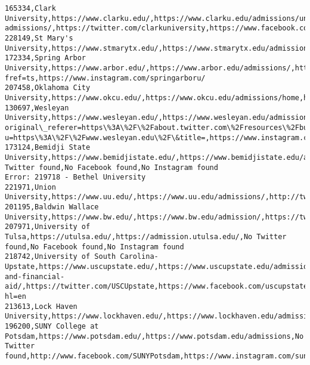 \documentclass[11pt]{article}
\begin{document}
\begin{Verbatim}[commandchars=\\\{\}]
165334,Clark University,https://www.clarku.edu/,https://www.clarku.edu/admissions/undergraduate-admissions/,https://twitter.com/clarkuniversity,https://www.facebook.com/ClarkUniversityWorcester,https://www.instagram.com/clarkuniversity/
228149,St Mary's University,https://www.stmarytx.edu/,https://www.stmarytx.edu/admission/,https://www.twitter.com/StMarysU,https://www.facebook.com/31373936394/posts/10155957464411395,https://www.instagram.com/p/BpaWVHIn48D/
172334,Spring Arbor University,https://www.arbor.edu/,https://www.arbor.edu/admissions/,https://twitter.com/springarboru,https://www.facebook.com/springarboru/?fref=ts,https://www.instagram.com/springarboru/
207458,Oklahoma City University,https://www.okcu.edu/,https://www.okcu.edu/admissions/home,https://twitter.com/okcu,https://www.facebook.com/oklahomacityuniversity,https://www.instagram.com/oklahomacityuniversity/
130697,Wesleyan University,https://www.wesleyan.edu/,https://www.wesleyan.edu/admission/,https://twitter.com/intent/tweet?original\_referer=https\%3A\%2F\%2Fabout.twitter.com\%2Fresources\%2Fbuttons\&text=\&tw\_p=tweetbutton\&url=https\%3A\%2F\%2Fwww.wesleyan.edu\%2F,https://www.facebook.com/sharer/sharer.php?u=https\%3A\%2F\%2Fwww.wesleyan.edu\%2F\&title=,https://www.instagram.com/wesleyan\_u/
173124,Bemidji State University,https://www.bemidjistate.edu/,https://www.bemidjistate.edu/admissions/,No Twitter found,No Facebook found,No Instagram found
Error: 219718 - Bethel University
221971,Union University,https://www.uu.edu/,https://www.uu.edu/admissions/,http://twitter.com/UnionUniversity/,http://facebook.com/UnionUniversity/,http://instagram.com/UnionUniversity/
201195,Baldwin Wallace University,https://www.bw.edu/,https://www.bw.edu/admission/,https://twitter.com/BaldwinWallace,http://www.facebook.com/baldwinwallaceuniversity,https://www.instagram.com/explore/tags/YJ4L/
207971,University of Tulsa,https://utulsa.edu/,https://admission.utulsa.edu/,No Twitter found,No Facebook found,No Instagram found
218742,University of South Carolina-Upstate,https://www.uscupstate.edu/,https://www.uscupstate.edu/admissions-and-financial-aid/,https://twitter.com/USCUpstate,https://www.facebook.com/uscupstate/,https://www.instagram.com/usc\_upstate/?hl=en
213613,Lock Haven University,https://www.lockhaven.edu/,https://www.lockhaven.edu/admissions/,https://twitter.com/LockHavenUniv,https://www.facebook.com/LockHavenUniv/,https://www.instagram.com/lockhavenuniv/
196200,SUNY College at Potsdam,https://www.potsdam.edu/,https://www.potsdam.edu/admissions,No Twitter found,http://www.facebook.com/SUNYPotsdam,https://www.instagram.com/sunypotsdam/

\end{Verbatim}
\end{document}
